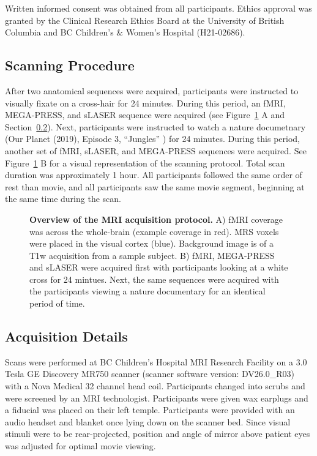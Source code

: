 \documentclass[
true
]{sn-jnl}
\makeatletter
\newcommand*\pandocbounded[1]{%
  \sbox\pandoc@box{#1}%
  \Gscale@div\@tempa{\textheight}{\dimexpr\ht\pandoc@box+\dp\pandoc@box\relax}%
  \Gscale@div\@tempb{\linewidth}{\wd\pandoc@box}%
  \ifdim\@tempb\p@<\@tempa\p@\let\@tempa\@tempb\fi%
  \ifdim\@tempa\p@<\p@\scalebox{\@tempa}{\usebox\pandoc@box}%
  \else\usebox{\pandoc@box}%
  \fi%
}
\makeatother
\begin{document}
Written informed consent was obtained from all participants. Ethics
approval was granted by the Clinical Research Ethics Board at the
University of British Columbia and BC Children's \& Women's Hospital
(H21-02686).

\subsection{Scanning Procedure}\label{scanning-procedure}

After two anatomical sequences were acquired, participants were
instructed to visually fixate on a cross-hair for 24 minutes. During
this period, an fMRI, MEGA-PRESS, and sLASER sequence were acquired (see
Figure~\ref{fig-method} A and Section~\ref{sec-mriacq}). Next,
participants were instructed to watch a nature documetnary (Our Planet
(2019), Episode 3, ``Jungles'' \citet{cordeyJungles2019}) for 24
minutes. During this period, another set of fMRI, sLASER, and MEGA-PRESS
sequences were acquired. See Figure~\ref{fig-method} B for a visual
representation of the scanning protocol. Total scan duration was
approximately 1 hour. All participants followed the same order of rest
than movie, and all participants saw the same movie segment, beginning
at the same time during the scan.

\label{cell-fig-method}
\begin{figure}[H]

\centering{

\pandocbounded{\texttt{[image: index\_files/figure-pdf/fig-method-1.pdf]}}

}

\caption{\label{fig-method}\textbf{Overview of the MRI acquisition
protocol.} A) fMRI coverage was across the whole-brain (example coverage
in red). MRS voxels were placed in the visual cortex (blue). Background
image is of a T1w acquisition from a sample subject. B) fMRI, MEGA-PRESS
and sLASER were acquired first with participants looking at a white
cross for 24 mintues. Next, the same sequences were acquired with the
participants viewing a nature documentary for an identical period of
time.}

\end{figure}%

\subsection{Acquisition Details}\label{sec-mriacq}

Scans were performed at BC Children's Hospital MRI Research Facility on
a 3.0 Tesla GE Discovery MR750 scanner (scanner software version:
DV26.0\_R03) with a Nova Medical 32 channel head coil. Participants
changed into scrubs and were screened by an MRI technologist.
Participants were given wax earplugs and a fiducial was placed on their
left temple. Participants were provided with an audio headset and
blanket once lying down on the scanner bed. Since visual stimuli were to
be rear-projected, position and angle of mirror above patient eyes was
adjusted for optimal movie viewing.
\end{document}

